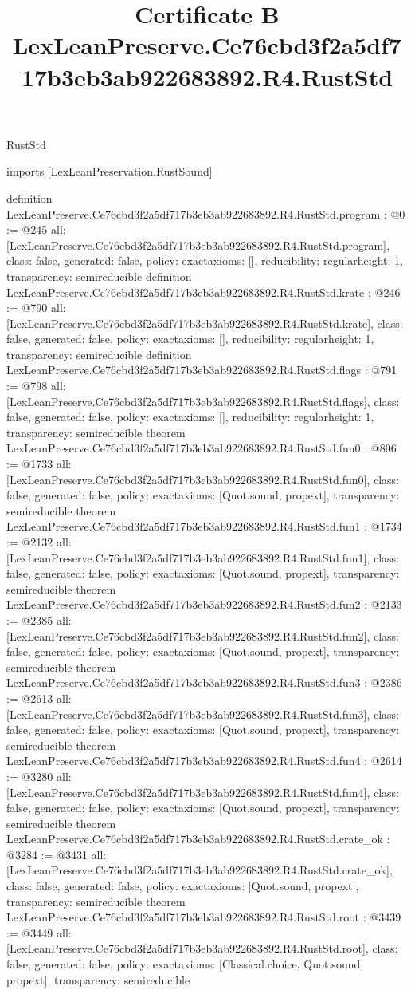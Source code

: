 \begin{lexlean}{RustStd}
\title{Certificate B LexLeanPreserve.Ce76cbd3f2a5df717b3eb3ab922683892.R4.RustStd}
\begin{coremodule}
imports [LexLeanPreservation.RustSound]

definition LexLeanPreserve.Ce76cbd3f2a5df717b3eb3ab922683892.R4.RustStd.program : @0 := @245 {
  all: [LexLeanPreserve.Ce76cbd3f2a5df717b3eb3ab922683892.R4.RustStd.program],
  class: false,
  generated: false,
  policy: exact{axioms: []},
  reducibility: regular{height: 1},
  transparency: semireducible
}
definition LexLeanPreserve.Ce76cbd3f2a5df717b3eb3ab922683892.R4.RustStd.krate : @246 := @790 {
  all: [LexLeanPreserve.Ce76cbd3f2a5df717b3eb3ab922683892.R4.RustStd.krate],
  class: false,
  generated: false,
  policy: exact{axioms: []},
  reducibility: regular{height: 1},
  transparency: semireducible
}
definition LexLeanPreserve.Ce76cbd3f2a5df717b3eb3ab922683892.R4.RustStd.flags : @791 := @798 {
  all: [LexLeanPreserve.Ce76cbd3f2a5df717b3eb3ab922683892.R4.RustStd.flags],
  class: false,
  generated: false,
  policy: exact{axioms: []},
  reducibility: regular{height: 1},
  transparency: semireducible
}
theorem LexLeanPreserve.Ce76cbd3f2a5df717b3eb3ab922683892.R4.RustStd.fun0 : @806 := @1733 {
  all: [LexLeanPreserve.Ce76cbd3f2a5df717b3eb3ab922683892.R4.RustStd.fun0],
  class: false,
  generated: false,
  policy: exact{axioms: [Quot.sound, propext]},
  transparency: semireducible
}
theorem LexLeanPreserve.Ce76cbd3f2a5df717b3eb3ab922683892.R4.RustStd.fun1 : @1734 := @2132 {
  all: [LexLeanPreserve.Ce76cbd3f2a5df717b3eb3ab922683892.R4.RustStd.fun1],
  class: false,
  generated: false,
  policy: exact{axioms: [Quot.sound, propext]},
  transparency: semireducible
}
theorem LexLeanPreserve.Ce76cbd3f2a5df717b3eb3ab922683892.R4.RustStd.fun2 : @2133 := @2385 {
  all: [LexLeanPreserve.Ce76cbd3f2a5df717b3eb3ab922683892.R4.RustStd.fun2],
  class: false,
  generated: false,
  policy: exact{axioms: [Quot.sound, propext]},
  transparency: semireducible
}
theorem LexLeanPreserve.Ce76cbd3f2a5df717b3eb3ab922683892.R4.RustStd.fun3 : @2386 := @2613 {
  all: [LexLeanPreserve.Ce76cbd3f2a5df717b3eb3ab922683892.R4.RustStd.fun3],
  class: false,
  generated: false,
  policy: exact{axioms: [Quot.sound, propext]},
  transparency: semireducible
}
theorem LexLeanPreserve.Ce76cbd3f2a5df717b3eb3ab922683892.R4.RustStd.fun4 : @2614 := @3280 {
  all: [LexLeanPreserve.Ce76cbd3f2a5df717b3eb3ab922683892.R4.RustStd.fun4],
  class: false,
  generated: false,
  policy: exact{axioms: [Quot.sound, propext]},
  transparency: semireducible
}
theorem LexLeanPreserve.Ce76cbd3f2a5df717b3eb3ab922683892.R4.RustStd.crate_ok : @3284 := @3431 {
  all: [LexLeanPreserve.Ce76cbd3f2a5df717b3eb3ab922683892.R4.RustStd.crate_ok],
  class: false,
  generated: false,
  policy: exact{axioms: [Quot.sound, propext]},
  transparency: semireducible
}
theorem LexLeanPreserve.Ce76cbd3f2a5df717b3eb3ab922683892.R4.RustStd.root : @3439 := @3449 {
  all: [LexLeanPreserve.Ce76cbd3f2a5df717b3eb3ab922683892.R4.RustStd.root],
  class: false,
  generated: false,
  policy: exact{axioms: [Classical.choice, Quot.sound, propext]},
  transparency: semireducible
}


\end{coremodule}
\end{lexlean}
